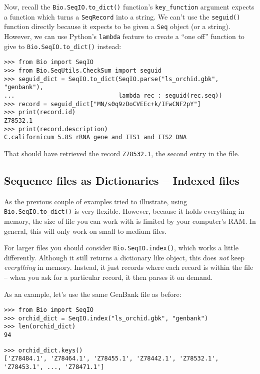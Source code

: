 Now, recall the \verb|Bio.SeqIO.to_dict()| function's \verb|key_function| argument expects a function which turns a \verb|SeqRecord| into a string.  We can't use the \verb|seguid()| function directly because it expects to be given a \verb|Seq| object (or a string).  However, we can use Python's \verb|lambda| feature to create a ``one off'' function to give to \verb|Bio.SeqIO.to_dict()| instead:

\begin{verbatim}
>>> from Bio import SeqIO
>>> from Bio.SeqUtils.CheckSum import seguid
>>> seguid_dict = SeqIO.to_dict(SeqIO.parse("ls_orchid.gbk", "genbank"),
...                             lambda rec : seguid(rec.seq))
>>> record = seguid_dict["MN/s0q9zDoCVEEc+k/IFwCNF2pY"]
>>> print(record.id)
Z78532.1
>>> print(record.description)
C.californicum 5.8S rRNA gene and ITS1 and ITS2 DNA
\end{verbatim}

\noindent That should have retrieved the record \texttt{Z78532.1}, the second entry in the file.

\subsection{Sequence files as Dictionaries -- Indexed files}
\label{sec:SeqIO-index}

As the previous couple of examples tried to illustrate, using
\verb|Bio.SeqIO.to_dict()| is very flexible. However, because it holds
everything in memory, the size of file you can work with is limited by your
computer's RAM. In general, this will only work on small to medium files.

For larger files you should consider
\verb|Bio.SeqIO.index()|, which works a little differently. Although
it still returns a dictionary like object, this does \emph{not} keep
\emph{everything} in memory. Instead, it just records where each record
is within the file -- when you ask for a particular record, it then parses
it on demand.

As an example, let's use the same GenBank file as before:

\begin{verbatim}
>>> from Bio import SeqIO
>>> orchid_dict = SeqIO.index("ls_orchid.gbk", "genbank")
>>> len(orchid_dict)
94
\end{verbatim}
\begin{verbatim}
>>> orchid_dict.keys()
['Z78484.1', 'Z78464.1', 'Z78455.1', 'Z78442.1', 'Z78532.1', 'Z78453.1', ..., 'Z78471.1']
\end{verbatim}

